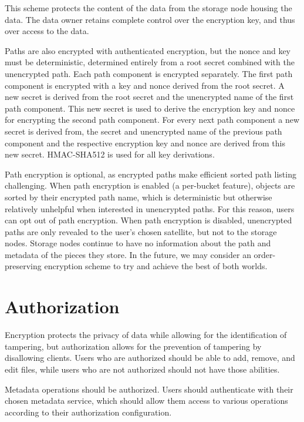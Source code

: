 \documentclass[11pt,fleqn,openany]{book}
\begin{document}
This scheme protects the
content of the data from the storage node housing the data. The data owner
retains complete control over the encryption key, and thus over access to the
data.

Paths are also encrypted with authenticated encryption, but the nonce and key
must be deterministic, determined entirely from a root secret combined with the
unencrypted path. Each path component is encrypted separately.
The first path component is encrypted with a key and nonce derived from the
root secret. A new secret is derived from the root secret and the unencrypted
name of the first path component. This new secret is used to derive the
encryption key and nonce for encrypting the second path component. For every
next path component a new secret is derived from, the secret and unencrypted
name of the previous path component and the respective encryption key and
nonce are derived from this new secret. HMAC-SHA512 is used for all key
derivations.

Path encryption is optional, as encrypted paths make efficient sorted path
listing challenging. When path encryption is enabled (a per-bucket feature),
objects are sorted by their encrypted path name, which is deterministic
but otherwise relatively unhelpful
when interested in unencrypted paths. For this reason, users can opt out of
path encryption. When path encryption is disabled, unencrypted paths
are only revealed to the user's chosen satellite, but not to the storage
nodes. Storage nodes continue to have no information about the path and
metadata of the pieces they store.
In the future, we may consider an order-preserving encryption scheme to try and
achieve the best of both worlds.

\section{Authorization}\label{sec:concrete-authorization}

Encryption protects the privacy of data while allowing for the identification
of tampering, but authorization allows for the prevention of tampering by
disallowing clients. Users who are authorized should be able to add, remove,
and edit files, while users who are not authorized should not have those abilities.

Metadata operations should be authorized. Users should authenticate with
their chosen metadata service, which should allow them
access to various operations according to their authorization configuration.
\end{document}
